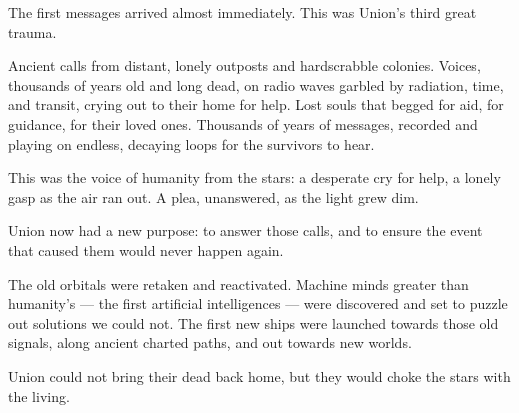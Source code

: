 The first messages arrived almost immediately. This was Union’s third great trauma. 
 

Ancient calls from distant, lonely outposts and hardscrabble colonies. Voices, thousands of years  
old and long dead, on radio waves garbled by radiation, time, and transit, crying out to their  
home for help. Lost souls that begged for aid, for guidance, for their loved ones. Thousands of  
years of messages, recorded and playing on endless, decaying loops for the survivors to hear. 
 

This was the voice of humanity from the stars: a desperate cry for help, a lonely gasp as the air  
ran out. A plea, unanswered, as the light grew dim.  
 

Union now had a new purpose: to answer those calls, and to ensure the event that caused them  
would never happen again.
 

The old orbitals were retaken and reactivated. Machine minds greater than humanity’s — the first  
artificial intelligences — were discovered and set to puzzle out solutions we could not. The first  
new ships were launched towards those old signals, along ancient charted paths, and out  
towards new worlds. 
 

Union could not bring their dead back home, but they would choke the stars with the living.
 

                                         